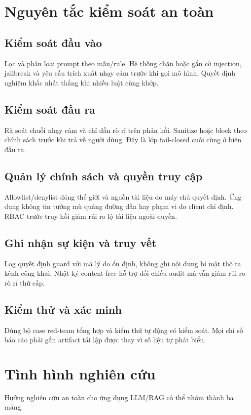 \section{Nguyên tắc kiểm soát an toàn}

\subsection{Kiểm soát đầu vào}
Lọc và phân loại prompt theo mẫu/rule. Hệ thống chặn hoặc gắn cờ injection, jailbreak và yêu cầu trích xuất nhạy cảm trước khi gọi mô hình. Quyết định nghiêm khắc nhất thắng khi nhiều luật cùng khớp.

\subsection{Kiểm soát đầu ra}
Rà soát chuỗi nhạy cảm và chỉ dẫn rò rỉ trên phản hồi. Sanitize hoặc block theo chính sách trước khi trả về người dùng. Đây là lớp fail-closed cuối cùng ở biên đầu ra.

\subsection{Quản lý chính sách và quyền truy cập}
Allowlist/denylist đóng thế giới và nguồn tài liệu do máy chủ quyết định. Ứng dụng không tin tưởng mù quáng đường dẫn hay phạm vi do client chỉ định. RBAC trước truy hồi giảm rủi ro lộ tài liệu ngoài quyền.

\subsection{Ghi nhận sự kiện và truy vết}
Log quyết định guard với mã lý do ổn định, không ghi nội dung bí mật thô ra kênh công khai. Nhật ký content-free hỗ trợ đối chiếu audit mà vẫn giảm rủi ro rò rỉ thứ cấp.

\subsection{Kiểm thử và xác minh}
Dùng bộ case red-team tổng hợp và kiểm thử tự động có kiểm soát. Mọi chỉ số báo cáo phải gắn artifact tái lập được thay vì số liệu tự phát biểu.

\section{Tình hình nghiên cứu}

Hướng nghiên cứu an toàn cho ứng dụng LLM/RAG có thể nhóm thành ba mảng.

